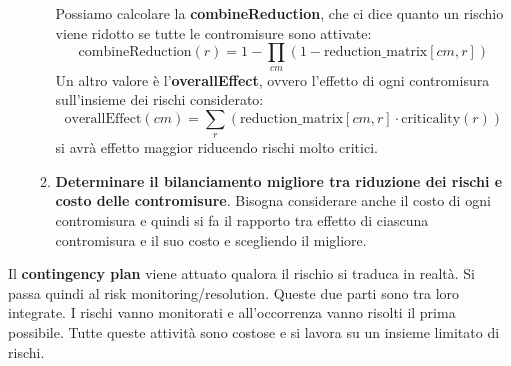 \begin{enumerate}
\begin{enumerate}
                    Possiamo calcolare la \textbf{combineReduction}, che ci dice
                    quanto un rischio viene ridotto se tutte le contromisure sono
                    attivate:
                    \begin{equation}
                        \text{combineReduction}(r) = 1 - \prod_{cm}(1 -
                        \text{reduction\_matrix}[cm, r])
                    \end{equation}
                    Un altro valore è l'\textbf{overallEffect}, ovvero l'effetto
                    di ogni contromisura sull'insieme dei rischi considerato:
                    \begin{equation}
                        \text{overallEffect}(cm) = \sum_{r} (\text{reduction\_matrix}[cm, r]
                        \cdot \text{criticality}(r))
                    \end{equation}
                    si avrà effetto maggior riducendo rischi molto critici.
              \item \textbf{Determinare il bilanciamento migliore tra riduzione
                        dei rischi e costo delle contromisure}.
                    Bisogna considerare anche il costo di ogni contromisura e
                    quindi si fa il rapporto tra effetto di ciascuna contromisura
                    e il suo costo e scegliendo il migliore.
          \end{enumerate}
\end{enumerate}
Il \textbf{contingency plan} viene attuato qualora il rischio si traduca in realtà.
Si passa quindi al risk monitoring/resolution. Queste due parti sono tra loro
integrate. I rischi vanno monitorati e all'occorrenza vanno risolti il prima
possibile. Tutte queste attività sono costose e si lavora su un insieme limitato
di rischi.